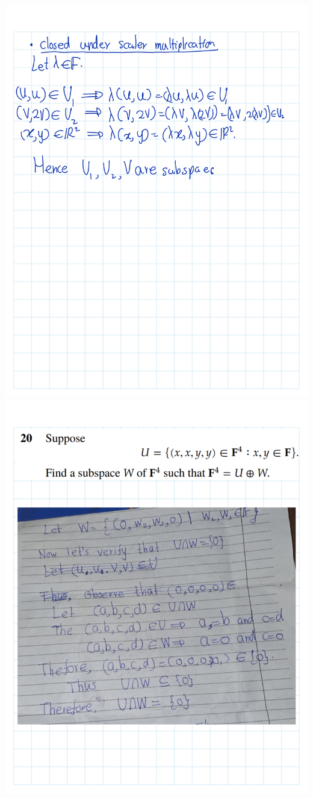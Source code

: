 \documentclass[
]{book}
\theoremstyle{definition}
\theoremstyle{definition}
\theoremstyle{definition}
\theoremstyle{definition}
\theoremstyle{remark}
\begin{document}
\begin{enumerate}
  \includegraphics{fig/Ex1C/Ex/Ex-22.png}
  \includegraphics{fig/Ex1C/Ex/Ex-23.png}

\end{enumerate}
\end{document}
